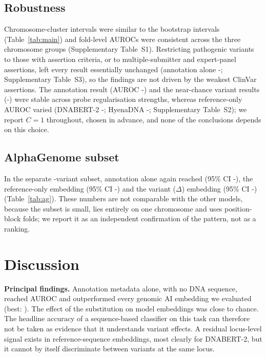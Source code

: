 \documentclass[11pt]{article}
\newcommand{\Dlt}{\Delta}
\newcommand{\ci}[2]{{\small(95\% CI #1-#2)}}
\begin{document}
\subsection{Robustness}
Chromosome-cluster intervals were similar to the bootstrap intervals (Table~\ref{tab:main}) and fold-level AUROCs were consistent across the three chromosome groups (Supplementary Table~S1). Restricting pathogenic variants to those with assertion criteria, or to multiple-submitter and expert-panel assertions, left every result essentially unchanged (annotation alone \RevAnnMin-\RevAnnMax; Supplementary Table~S3), so the findings are not driven by the weakest ClinVar assertions. The annotation result (AUROC \CAnnMin-\CAnnMax) and the near-chance variant results (\CDeltaMin-\CDeltaMax) were stable across probe regularisation strengths, whereas reference-only AUROC varied (DNABERT-2 \CRefDnbMin-\CRefDnbMax; HyenaDNA \CRefHynMin-\CRefHynMax; Supplementary Table~S2); we report $C=1$ throughout, chosen in advance, and none of the conclusions depends on this choice.

\subsection{AlphaGenome subset}
In the separate \AgN-variant subset, annotation alone again reached \AgMeta{} \ci{\AgMetaLo}{\AgMetaHi}, the reference-only embedding \AgRef{} \ci{\AgRefLo}{\AgRefHi} and the variant ($\Dlt$) embedding \AgDelta{} \ci{\AgDeltaLo}{\AgDeltaHi} (Table~\ref{tab:ag}). These numbers are not comparable with the other models, because the subset is small, lies entirely on one chromosome and uses position-block folds; we report it as an independent confirmation of the pattern, not as a ranking.

\begin{table}[t]
\centering\small

\caption{AlphaGenome validation subset (\AgPath{} pathogenic, \AgCommon{} common variants; all on chromosome~8; five position-block folds). Not comparable with Table~\ref{tab:main}.}
\label{tab:ag}
\end{table}

\section{Discussion}
\textbf{Principal findings.} Annotation metadata alone, with no DNA sequence, reached AUROC \MetaAll{} and outperformed every genomic AI embedding we evaluated (best: \DnbRef). The effect of the substitution on model embeddings was close to chance. The headline accuracy of a sequence-based classifier on this task can therefore not be taken as evidence that it understands variant effects. A residual locus-level signal exists in reference-sequence embeddings, most clearly for DNABERT-2, but it cannot by itself discriminate between variants at the same locus.
\end{document}
